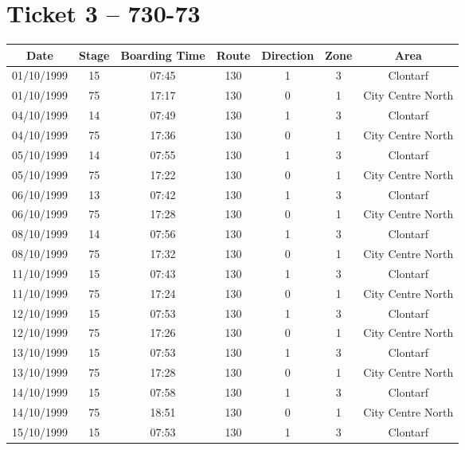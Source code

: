  \normalsize{} 


\newpage


\section{Ticket 3 -- 730-73}
\label{Appendix: Ticket 3 -- 730-73}



\footnotesize{}  \vspace{10pt}  \begin{longtable}[htbp] {ccccccc} \hline
\textbf{Date}& \textbf{Stage}& \textbf{Boarding Time}& \textbf{Route}& \textbf{Direction}&
\textbf{Zone}&
\textbf{Area} \\
\hline \hline 01/10/1999& 15& 07:45& 130& 1& 3&
Clontarf \\
\hline 01/10/1999& 75& 17:17& 130& 0& 1&
City Centre North \\
\hline 04/10/1999& 14& 07:49& 130& 1& 3&
Clontarf \\
\hline 04/10/1999& 75& 17:36& 130& 0& 1&
City Centre North \\
\hline 05/10/1999& 14& 07:55& 130& 1& 3&
Clontarf \\
\hline 05/10/1999& 75& 17:22& 130& 0& 1&
City Centre North \\
\hline 06/10/1999& 13& 07:42& 130& 1& 3&
Clontarf \\
\hline 06/10/1999& 75& 17:28& 130& 0& 1&
City Centre North \\
\hline 08/10/1999& 14& 07:56& 130& 1& 3&
Clontarf \\
\hline 08/10/1999& 75& 17:32& 130& 0& 1&
City Centre North \\
\hline 11/10/1999& 15& 07:43& 130& 1& 3&
Clontarf \\
\hline 11/10/1999& 75& 17:24& 130& 0& 1&
City Centre North \\
\hline 12/10/1999& 15& 07:53& 130& 1& 3&
Clontarf \\
\hline 12/10/1999& 75& 17:26& 130& 0& 1&
City Centre North \\
\hline 13/10/1999& 15& 07:53& 130& 1& 3&
Clontarf \\
\hline 13/10/1999& 75& 17:28& 130& 0& 1&
City Centre North \\
\hline 14/10/1999& 15& 07:58& 130& 1& 3&
Clontarf \\
\hline 14/10/1999& 75& 18:51& 130& 0& 1&
City Centre North \\
\hline 15/10/1999& 15& 07:53& 130& 1& 3&
Clontarf \\

\end{longtable}
